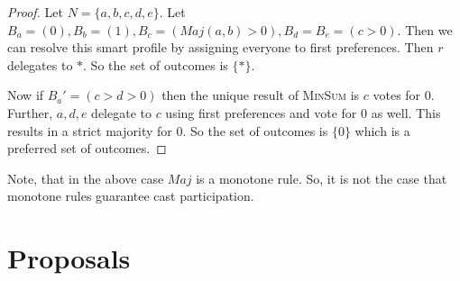 \documentclass[11pt,a4paper, titlepage]{article}
\theoremstyle{definition}
\begin{document}
\begin{proof}
    Let $N = \{a, b, c, d, e\}$. Let $B_a = (0), B_b = (1), B_c = (\mathit{Maj}(a, b) > 0), B_d = B_e = (c > 0)$. Then we can resolve this smart profile by assigning everyone to first preferences. Then $r$ delegates to $*$. So the set of outcomes is $\{*\}$.
    
    Now if $B_a' = (c > d > 0)$ then the unique result of \textsc{MinSum} is $c$ votes for $0$. Further, $a, d, e$ delegate to $c$ using first preferences and vote for $0$ as well. This results in a strict majority for $0$. So the set of outcomes is $\{0\}$ which is a preferred set of outcomes.
\end{proof}

Note, that in the above case $\mathit{Maj}$ is a monotone rule. So, it is not the case that monotone rules guarantee cast participation.

\iffalse
Plan for this section:
1) Cast participation is achieved only for monotone functions. So, let's focus on monotone functions
2) Prove NP-hardness for MinMax, MinSum using only binary or and binary and.
3) Prove that no constant approximator to MinMax or MinSum exists.
4) Result on whether we are able to even determine whether a vote is achievable.
5) Generalise on why the proof works for all non-delegative, fair and monotone functions. 
\fi

\newpage
\section{Proposals}
\end{document}

